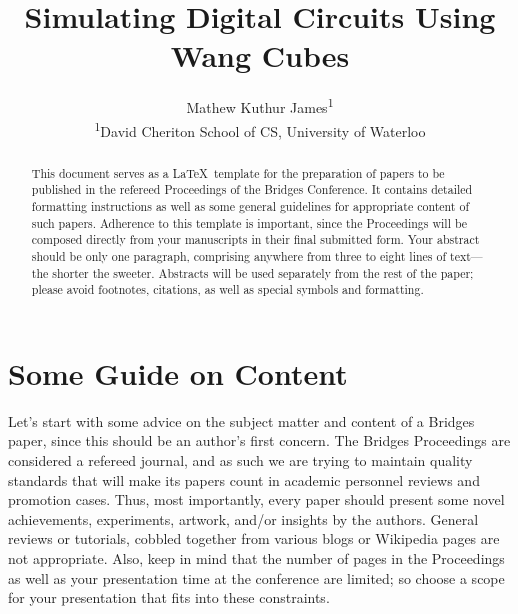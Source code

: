 \documentclass[letterpaper,11pt]{article}
\title{Simulating Digital Circuits Using Wang Cubes}
\author{Mathew Kuthur James\textsuperscript{1}
\vspace{10pt}\\
\textsuperscript{1}David Cheriton School of CS, University of Waterloo} %
\date{}					%
\begin{document}
\maketitle

\thispagestyle{empty}

\begin{abstract}

This document serves as a \LaTeX\ template for the preparation of papers to be
published in the refereed Proceedings of the Bridges Conference. It
contains detailed formatting instructions as well as some general
guidelines for appropriate content of such papers. Adherence to this
template is important, since the Proceedings will be composed directly
from your manuscripts in their final submitted form. Your abstract
should be only one paragraph, comprising anywhere from three to eight
lines of text---the shorter the sweeter. Abstracts will be used
separately from the rest of the paper; please avoid footnotes,
citations, as well as special symbols and formatting.

\end{abstract}


\section*{Some Guide on Content}


Let's start with some advice on the subject matter and content of a
Bridges paper, since this should be an author's first concern. The
Bridges Proceedings are considered a refereed journal, and as such we
are trying to maintain quality standards that will make its papers count
in academic personnel reviews and promotion cases. Thus, most
importantly, every paper should present some novel achievements,
experiments, artwork, and/or insights by the authors. General reviews or
tutorials, cobbled together from various blogs or Wikipedia pages are
not appropriate. Also, keep in mind that the number of pages in the
Proceedings as well as your presentation time at the conference are
limited; so choose a scope for your presentation that fits into these
constraints.
\end{document}
